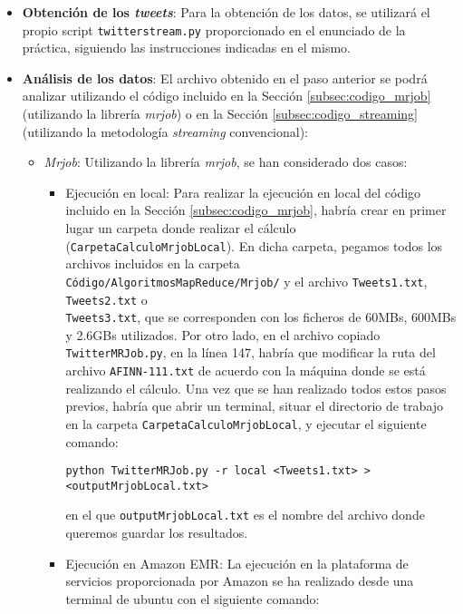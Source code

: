 \documentclass[10pt, spanish]{article}
\begin{document}
\begin{appendices}
\begin{itemize}
\item \textbf{Obtención de los \textit{tweets}}: Para la obtención de los datos, se utilizará el propio script \texttt{twitterstream.py} proporcionado en el enunciado de la práctica, siguiendo las instrucciones indicadas en el mismo. 
\item \textbf{Análisis de los datos}: El archivo obtenido en el paso anterior se podrá analizar utilizando el código incluido en la Sección \ref{subsec:codigo_mrjob} (utilizando la librería \textit{mrjob}) o en la Sección \ref{subsec:codigo_streaming} (utilizando la metodología \textit{streaming} convencional):
\begin{itemize}
\item \textit{Mrjob}: Utilizando la librería \textit{mrjob}, se han considerado dos casos:
\begin{itemize}
\item Ejecución en local: Para realizar la ejecución en local del código incluido en la Sección \ref{subsec:codigo_mrjob}, habría crear en primer lugar un carpeta donde realizar el cálculo (\texttt{CarpetaCalculoMrjobLocal}). En dicha carpeta, pegamos todos los archivos incluidos en la carpeta \\
\texttt{Código/AlgoritmosMapReduce/Mrjob/} y el archivo \texttt{Tweets1.txt}, \texttt{Tweets2.txt} o \\ \texttt{Tweets3.txt}, que se corresponden con los ficheros de 60MBs, 600MBs y 2.6GBs utilizados. Por otro lado, en el archivo copiado \texttt{TwitterMRJob.py}, en la línea 147, habría que modificar la ruta del archivo \texttt{AFINN-111.txt} de acuerdo con la máquina donde se está realizando el cálculo. Una vez que se han realizado todos estos pasos previos, habría que abrir un terminal, situar el directorio de trabajo en la carpeta \texttt{CarpetaCalculoMrjobLocal}, y ejecutar el siguiente comando:

\texttt{python TwitterMRJob.py -r local <Tweets1.txt>\hspace{1mm} > \hspace{1mm} <outputMrjobLocal.txt>}

en el que \texttt{outputMrjobLocal.txt} es el nombre del archivo donde queremos guardar los resultados.

\item Ejecución en Amazon EMR: La ejecución en la plataforma de servicios proporcionada por Amazon se ha realizado desde una terminal de ubuntu con el siguiente comando:


\end{itemize}
\end{itemize}
\end{itemize}
\end{appendices}
\end{document}
